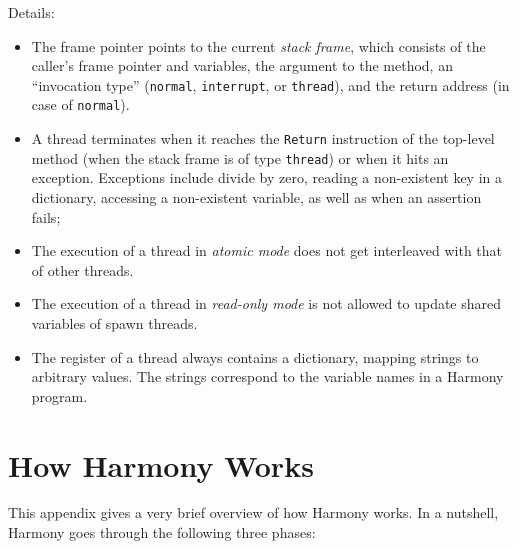 \documentclass{report}
\begin{document}
Details:
\begin{itemize}
\item The frame pointer points to the current \emph{stack frame},
which consists of the caller's frame pointer and variables, the argument to
the method, an ``invocation type'' (\texttt{normal}, \texttt{interrupt}, or
\texttt{thread}), and the return address (in case of \texttt{normal}).
\item A thread terminates when it reaches the \texttt{Return} instruction
of the top-level method (when the stack frame is of type \texttt{thread})
or when it hits an exception.  Exceptions include divide by zero,
reading a non-existent key in a dictionary, accessing a non-existent
variable, as well as when an assertion fails;
\item The execution of a thread in \emph{atomic mode} does not get interleaved
with that of other threads.
\item The execution of a thread in \emph{read-only mode} is not allowed
to update shared variables of spawn threads.
\item The register of a thread always contains a dictionary, mapping
strings to arbitrary values.  The strings correspond to the variable names
in a Harmony program.
\end{itemize}

\chapter{How Harmony Works}\label{app:howitworks}

This appendix gives a very brief overview of how Harmony works.
In a nutshell, Harmony goes through the following three phases:
\end{document}
